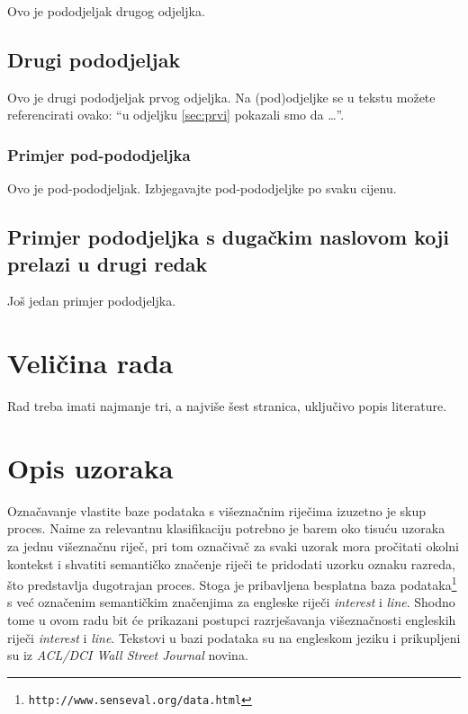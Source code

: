 \documentclass[10pt, a4paper]{article}
\begin{document}
Ovo je pododjeljak drugog odjeljka.

\subsection{Drugi pododjeljak}

Ovo je drugi pododjeljak prvog odjeljka. Na (pod)odjeljke se 
u tekstu možete referencirati ovako: ``u odjeljku \ref{sec:prvi}
pokazali smo da \dots''.

\subsubsection{Primjer pod-pododjeljka} 

Ovo je pod-pododjeljak. Izbjegavajte pod-pododjeljke po svaku cijenu.

\subsection{Primjer pododjeljka s dugačkim naslovom koji prelazi u
drugi redak}

Još jedan primjer pododjeljka.

\section{Veličina rada}

Rad treba imati najmanje tri, a najviše šest stranica, uključivo popis
literature.

\section{Opis uzoraka}
Označavanje vlastite baze podataka s višeznačnim riječima izuzetno je
skup proces. Naime za relevantnu klasifikaciju potrebno je barem
oko tisuću uzoraka za jednu višeznačnu riječ, pri tom
označivač za svaki uzorak mora pročitati okolni kontekst i 
shvatiti semantičko značenje riječi te pridodati uzorku oznaku razreda,
što predstavlja dugotrajan proces. Stoga je pribavljena besplatna
baza podataka\footnote{\texttt{http://www.senseval.org/data.html}} s već označenim semantičkim
značenjima za engleske riječi \emph{interest} i \emph{line}. Shodno tome u ovom radu bit će prikazani
postupci razrješavanja višeznačnosti engleskih riječi \emph{interest} i \emph{line}.
Tekstovi u bazi podataka su na engleskom jeziku
i prikupljeni su iz \emph{ACL/DCI Wall Street Journal} novina.
\end{document}
